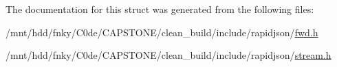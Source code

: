 The documentation for this struct was generated from the following files\+:\begin{DoxyCompactItemize}
\item 
/mnt/hdd/fnky/\+C0de/\+C\+A\+P\+S\+T\+O\+N\+E/clean\+\_\+build/include/rapidjson/\hyperlink{fwd_8h}{fwd.\+h}\item 
/mnt/hdd/fnky/\+C0de/\+C\+A\+P\+S\+T\+O\+N\+E/clean\+\_\+build/include/rapidjson/\hyperlink{stream_8h}{stream.\+h}\end{DoxyCompactItemize}
